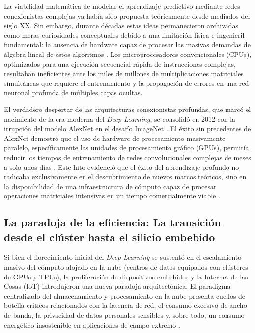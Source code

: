 \documentclass[12pt, a4paper]{article}
\begin{document}
La viabilidad matemática de modelar el aprendizaje predictivo mediante redes conexionistas complejas ya había sido propuesta teóricamente desde mediados del siglo XX. Sin embargo, durante décadas estas ideas permanecieron archivadas como meras curiosidades conceptuales debido a una limitación física e ingenieril fundamental: la ausencia de hardware capaz de procesar las masivas demandas de álgebra lineal de estos algoritmos \parencite{dally2021evolution}. Los microprocesadores convencionales (CPUs), optimizados para una ejecución secuencial rápida de instrucciones complejas, resultaban ineficientes ante los miles de millones de multiplicaciones matriciales simultáneas que requiere el entrenamiento y la propagación de errores en una red neuronal profunda de múltiples capas ocultas. 

El verdadero despertar de las arquitecturas conexionistas profundas, que marcó el nacimiento de la era moderna del \textit{Deep Learning}, se consolidó en 2012 con la irrupción del modelo AlexNet en el desafío ImageNet \parencite{krizhevsky2012imagenet}. El éxito sin precedentes de AlexNet demostró que el uso de hardware de procesamiento masivamente paralelo, específicamente las unidades de procesamiento gráfico (GPUs), permitía reducir los tiempos de entrenamiento de redes convolucionales complejas de meses a solo unos días \parencite{krizhevsky2012imagenet, dally2021evolution}. Este hito evidenció que el éxito del aprendizaje profundo no radicaba exclusivamente en el descubrimiento de nuevos marcos teóricos, sino en la disponibilidad de una infraestructura de cómputo capaz de procesar operaciones matriciales intensivas en un tiempo comercialmente viable \parencite{dally2021evolution}.

\subsection{La paradoja de la eficiencia: La transición desde el clúster hasta el silicio embebido}

Si bien el florecimiento inicial del \textit{Deep Learning} se sustentó en el escalamiento masivo del cómputo alojado en la nube (centros de datos equipados con clústeres de GPUs y TPUs), la proliferación de dispositivos embebidos y la Internet de las Cosas (IoT) introdujeron una nueva paradoja arquitectónica. El paradigma centralizado del almacenamiento y procesamiento en la nube presenta cuellos de botella críticos relacionados con la latencia de red, el consumo excesivo de ancho de banda, la privacidad de datos personales sensibles y, sobre todo, un consumo energético insostenible en aplicaciones de campo extremo \parencite{capogrosso2023machine}.
\end{document}
